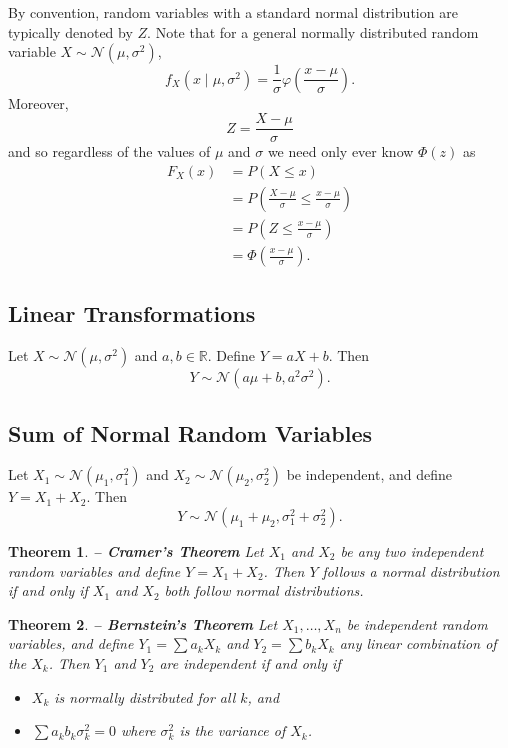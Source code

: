 \documentclass[1pt]{report}
\newtheorem{thm}{Theorem}[chapter]
\newcommand{\Rone}{\mathbb{R}}
\newcommand{\R}{\Rone}
\newcommand{\<}{\langle}
\renewcommand{\>}{\rangle}
\newcommand{\NN}{\mathcal{N}}
\let\phi\varphi
\begin{document}
By convention, random variables with a standard normal distribution are typically denoted by $Z$. Note that for a general normally distributed random variable $X \sim \NN(\mu, \sigma^2)$, 
$$f_X(x\mid \mu,\sigma^2) = \frac{1}{\sigma} \phi\left(\frac{x -\mu}{\sigma}\right).$$
Moreover, 
$$Z = \frac{X-\mu}{\sigma}$$
and so regardless of the values of $\mu$ and $\sigma$ we need only ever know $\Phi(z)$ as 
\begin{align*}
F_X(x) &= P(X \leq x) \\
&= P\left(\frac{X-\mu}{\sigma} \leq \frac{x-\mu}{\sigma}\right) \\
&= P\left(Z \leq \frac{x-\mu}{\sigma}\right) \\
&= \Phi\left(\frac{x-\mu}{\sigma}\right).
\end{align*}
\subsection{Linear Transformations}
Let $X \sim \NN(\mu, \sigma^2)$ and $a,b\in \R$. Define $Y = aX + b$. Then 
$$Y \sim \NN(a\mu + b , a^2\sigma^2).$$
\subsection{Sum of Normal Random Variables}
Let $X_1 \sim \NN(\mu_1, \sigma_1^2)$ and $X_2 \sim \NN(\mu_2, \sigma_2^2)$ be independent, and define $Y = X_1 + X_2$. Then 
$$Y \sim \NN(\mu_1 + \mu_2, \sigma^2_1 + \sigma^2_2).$$
\begin{thm}\textbf{ -- Cramer's Theorem}
Let $X_1$ and $X_2$ be any two independent random variables and define $Y = X_1 + X_2$. Then $Y$ follows a normal distribution if and only if $X_1$ and $X_2$ both follow normal distributions.
\end{thm}
\begin{thm}\textbf{ -- Bernstein's Theorem}
Let $X_1,\dots, X_n$ be independent random variables, and define $Y_1= \sum a_kX_k$ and $Y_2 = \sum b_k X_k$ any linear combination of the $X_k$. Then $Y_1$ and $Y_2$ are independent if and only if 
\begin{itemize}
\item $X_k$ is normally distributed for all $k$, and
\item $\sum a_k b_k \sigma_k^2 = 0$ where $\sigma_k^2$ is the variance of $X_k$.
\end{itemize}
\end{thm}
\end{document}
